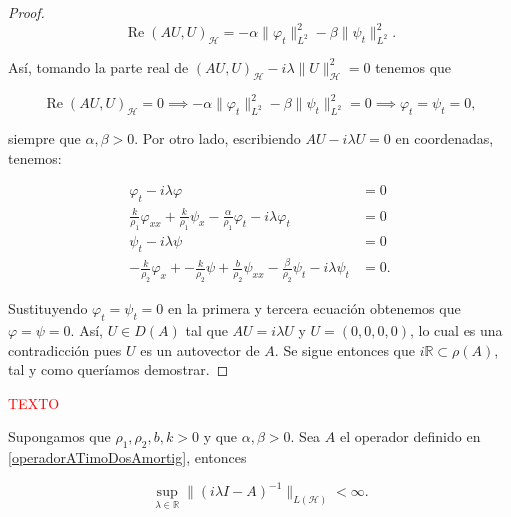 \begin{proof}
    \[\operatorname{Re}(AU, U)_{\mathcal{H}} = -\alpha \lVert \varphi_t\rVert^2_{L^2} - \beta\lVert \psi_t \rVert^2_{L^2}.\]
    
    Así, tomando la parte real de $(AU, U)_{\mathcal{H}} - i\lambda \lVert U \rVert^2_{\mathcal{H}} = 0$ tenemos que

    \[\operatorname{Re}(AU, U)_{\mathcal{H}} = 0 \implies -\alpha \lVert \varphi_t\rVert^2_{L^2} - \beta\lVert \psi_t \rVert^2_{L^2} = 0 \implies \varphi_t = \psi_t = 0,\]

    siempre que $\alpha, \beta > 0$. Por otro lado, escribiendo $AU - i\lambda U = 0$ en coordenadas, tenemos:

    \begin{align*}
        \varphi_t - i\lambda \varphi &= 0\\
        \frac{k}{\rho_1}\varphi_{xx} + \frac{k}{\rho_1}\psi_x - \frac{\alpha}{\rho_1}\varphi_t - i\lambda\varphi_t &= 0\\
        \psi_t -i\lambda \psi &= 0\\
        -\frac{k}{\rho_2}\varphi_x + -\frac{k}{\rho_2}\psi + \frac{b}{\rho_2}\psi_{xx} - \frac{\beta}{\rho_2}\psi_t - i\lambda\psi_t &= 0.
    \end{align*}

    Sustituyendo $\varphi_t = \psi_t = 0$ en la primera y tercera ecuación obtenemos que $\varphi = \psi = 0$. Así, $U \in D(A)$ tal que $AU = i\lambda U$ y $U = (0,0,0,0)$, lo cual es una contradicción pues $U$ es un autovector de $A$. Se sigue entonces que $i\mathbb{R} \subset \rho(A)$, tal y como queríamos demostrar.
\end{proof}

\textcolor{red}{TEXTO}\\

\begin{Lema}
\label{ch:TimoshenkoFric:lemma:acotacionResolvente}
    Supongamos que $\rho_1, \rho_2, b, k > 0$ y que $\alpha,\beta > 0$. Sea $A$ el operador definido en \eqref{operadorATimoDosAmortig}, entonces

    \[\sup_{\lambda \in \mathbb{R}} \lVert (i\lambda I - A)^{-1}\rVert_{L(\mathcal{H})} < \infty.\]
\end{Lema}

